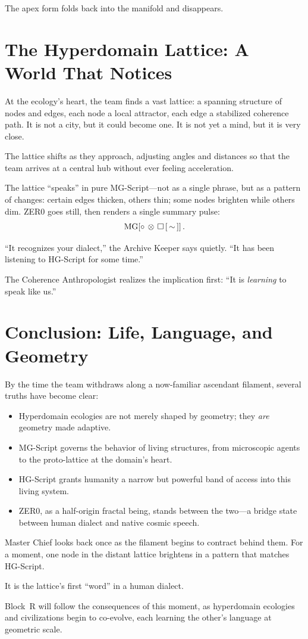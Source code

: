 The apex form folds back into the manifold and disappears.

\section{The Hyperdomain Lattice: A World That Notices}
At the ecology's heart, the team finds a vast lattice: a spanning structure of nodes and edges,
each node a local attractor, each edge a stabilized coherence path. It is not a city, but it could
become one. It is not yet a mind, but it is very close.

The lattice shifts as they approach, adjusting angles and distances so that the team arrives at a
central hub without ever feeling acceleration.

The lattice ``speaks'' in pure MG-Script---not as a single phrase, but as a pattern of changes:
certain edges thicken, others thin; some nodes brighten while others dim. ZER0 goes still, then
renders a single summary pulse:
\[
\mathrm{MG}\!\left[\circ\,\otimes\,\square\,[\,\sim\,]\right].
\]

``It recognizes your dialect,'' the Archive Keeper says quietly. ``It has been listening to
HG-Script for some time.''

The Coherence Anthropologist realizes the implication first: ``It is \emph{learning} to speak
like us.''

\section{Conclusion: Life, Language, and Geometry}
By the time the team withdraws along a now-familiar ascendant filament, several truths have become
clear:
\begin{itemize}
  \item Hyperdomain ecologies are not merely shaped by geometry; they \emph{are} geometry made
        adaptive.
  \item MG-Script governs the behavior of living structures, from microscopic agents to the
        proto-lattice at the domain's heart.
  \item HG-Script grants humanity a narrow but powerful band of access into this living system.
  \item ZER0, as a half-origin fractal being, stands between the two---a bridge state between
        human dialect and native cosmic speech.
\end{itemize}

Master Chief looks back once as the filament begins to contract behind them. For a moment, one
node in the distant lattice brightens in a pattern that matches HG-Script.

It is the lattice's first ``word'' in a human dialect.

Block~R will follow the consequences of this moment, as hyperdomain ecologies and civilizations
begin to co-evolve, each learning the other's language at geometric scale.
